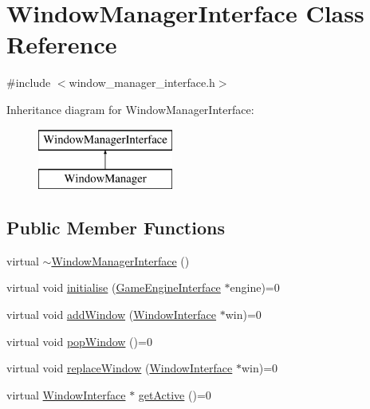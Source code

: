 \hypertarget{classWindowManagerInterface}{\section{Window\-Manager\-Interface Class Reference}
\label{classWindowManagerInterface}
}


{\ttfamily \#include $<$window\-\_\-manager\-\_\-interface.\-h$>$}

Inheritance diagram for Window\-Manager\-Interface\-:\begin{figure}[H]
\begin{center}
\leavevmode
\includegraphics[height=2.000000cm]{classWindowManagerInterface}
\end{center}
\end{figure}
\subsection*{Public Member Functions}
\begin{DoxyCompactItemize}
\item 
virtual \hyperlink{classWindowManagerInterface_aec641c997562e0ca7af76c723ccf7330}{$\sim$\-Window\-Manager\-Interface} ()
\item 
virtual void \hyperlink{classWindowManagerInterface_aa5332643f381faff81e0bb4af1c1941e}{initialise} (\hyperlink{classGameEngineInterface}{Game\-Engine\-Interface} $\ast$engine)=0
\item 
virtual void \hyperlink{classWindowManagerInterface_aac36e2671a3d60b6b14469176da14c70}{add\-Window} (\hyperlink{classWindowInterface}{Window\-Interface} $\ast$win)=0
\item 
virtual void \hyperlink{classWindowManagerInterface_a4e9b4365650eeb65babbab6ddff30677}{pop\-Window} ()=0
\item 
virtual void \hyperlink{classWindowManagerInterface_a776651d54dbdcdbe4d09b03f22cb0cdb}{replace\-Window} (\hyperlink{classWindowInterface}{Window\-Interface} $\ast$win)=0
\item 
virtual \hyperlink{classWindowInterface}{Window\-Interface} $\ast$ \hyperlink{classWindowManagerInterface_a67c7bd0f3376cd9bd9be6970902d871a}{get\-Active} ()=0
\end{DoxyCompactItemize}


